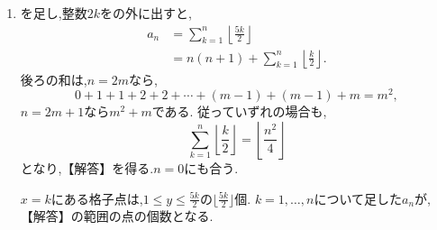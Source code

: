 \noindent {}\par\nobreak
\begin{enumerate}[label=(\arabic*),parsep=3pt,beginpenalty=10000,format=\bookitemlink{example-gauss-role-10}{solution}{problem}]
  \item {}を足し,整数$2k$をの外に出すと,
    \begin{align*}
      a_n&=\sum_{k=1}^{n}\left\lfloor\frac{5k}{2}\right\rfloor\\
      &=n(n+1)+\sum_{k=1}^{n}\left\lfloor\frac k2\right\rfloor.
    \end{align*}
    後ろの和は,$n=2m$なら,
    \[
      0+1+1+2+2+\cdots+(m-1)+(m-1)+m=m^2,
    \]
    $n=2m+1$なら$m^2+m$である.
    従っていずれの場合も,
    \[
      \sum_{k=1}^{n}\left\lfloor\frac k2\right\rfloor
      =\left\lfloor\frac{n^2}{4}\right\rfloor
    \]
    となり,【解答】を得る.$n=0$にも合う.

    $x=k$にある格子点は,$1\le y\le\frac{5k}{2}$の$\lfloor\frac{5k}{2}\rfloor$個.
    $k=1,\ldots,n$について足した$a_n$が,【解答】の範囲の点の個数となる.
\end{enumerate}
